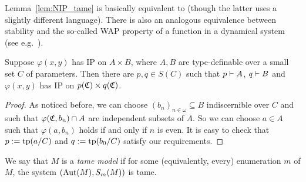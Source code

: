 	\begin{rem}
		Lemma~\ref{lem:NIP_tame} is basically equivalent to \cite[Corollary 3.2]{Ib16} (though the latter uses a slightly different language).
		There is also an analogous equivalence between stability and the so-called WAP property of a function in a dynamical system (see e.g.\ \cite{BT16}).\xqed{\lozenge}
	\end{rem}
	
	\begin{lem}
		\label{lem:NIP_local}
		Suppose $\varphi(x,y)$ has IP on $A\times B$, where $A,B$ are type-definable over a small set $C$ of parameters. Then there are $p,q\in S(C)$ such that $p\vdash A$, $q\vdash B$ and $\varphi(x,y)$ has IP on $p({\mathfrak C})\times q({\mathfrak C})$.
	\end{lem}
	
	\begin{proof}
		As noticed before, we can choose $(b_n)_{n \in \omega} \subseteq B$ indiscernible over $C$ and such that $\varphi({\mathfrak C},b_n) \cap A$ are independent subsets of $A$. So we can choose $a \in A$ such that $\varphi(a,b_n)$ holds if and only if $n$ is even. It is easy to check that $p := \operatorname{{tp}}(a/C)$ and $q:=\operatorname{{tp}}(b_0/C)$ satisfy our requirements.
	\end{proof}
	
	
	\begin{dfn}
		\label{dfn:tame_model}
		We say that $M$ is a \emph{tame model} if for some (equivalently, every) enumeration $m$ of $M$, the system $(\operatorname{{Aut}}(M),S_m(M))$ is tame.
		\xqed{\lozenge}
	\end{dfn}
	
